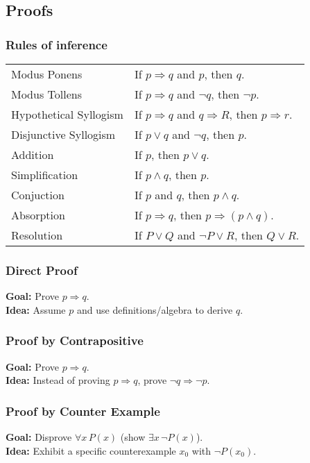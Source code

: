 \documentclass[5pt]{article}
\begin{document}
\begin{multicols}{2}
\subsection{Proofs}
\subsubsection{Rules of inference}
\begin{tabular}{ll}
    Modus Ponens            &   If $p\Rightarrow q$ and $p$, then $q$.\\
    Modus Tollens           &   If $p\Rightarrow q$ and $\lnot q$, then $\lnot p$.\\
    Hypothetical Syllogism  &   If $p\Rightarrow q$ and $q\Rightarrow R$, then $p\Rightarrow r$.\\
    Disjunctive Syllogism   &   If $p\lor q$ and $\lnot q$, then $p$.\\
    Addition                &   If $p$, then $p\lor q$.\\
    Simplification          &   If $p\land q$, then $p$.\\
    Conjuction              &   If $p$ and $q$, then $p\land q$.\\
    Absorption              &   If $p\Rightarrow q$, then $p\Rightarrow (p\land q)$.\\
    Resolution              &   If $P\lor Q$ and $\lnot P\lor R$, then $Q\lor R$.
\end{tabular}

\subsubsection{Direct Proof}
\textbf{Goal:} Prove $p\Rightarrow q$.\\
\textbf{Idea:} Assume $p$ and use definitions/algebra to derive $q$.\\

\subsubsection{Proof by Contrapositive}
\textbf{Goal:} Prove $p\Rightarrow q$.\\
\textbf{Idea:} Instead of proving $p\Rightarrow q$, prove $\lnot q\Rightarrow \lnot p$.\\

\subsubsection{Proof by Counter Example}
\textbf{Goal:} Disprove $\forall x\,P(x)$ (show $\exists x\,\lnot P(x)$).\\
\textbf{Idea:} Exhibit a specific counterexample $x_0$ with $\lnot P(x_0)$.\\


\end{multicols}
\end{document}
